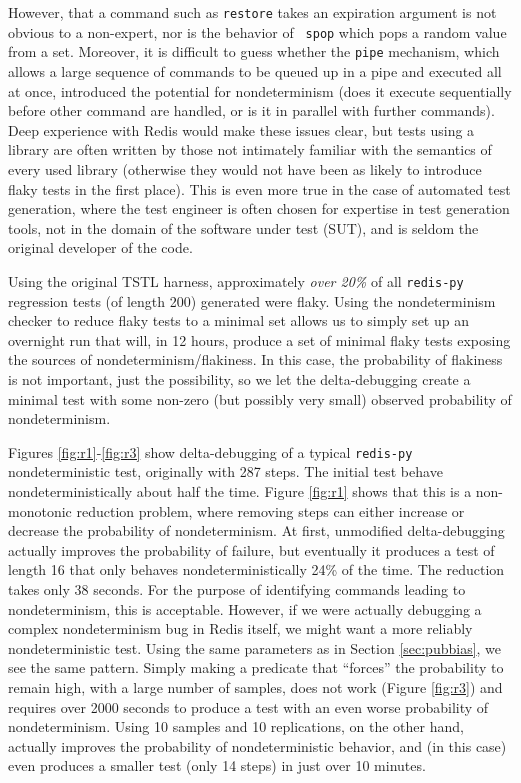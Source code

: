 However, that a command such as {\tt restore} takes an expiration
argument is not obvious to a non-expert, nor is the behavior of {\tt
  spop} which pops a random value from a set.  Moreover, it is
difficult to guess whether the {\tt pipe} mechanism, which allows a
large sequence of commands to be queued up in a pipe and executed all
at once, introduced the potential for nondeterminism (does it execute
sequentially before other command are handled, or is it in parallel
with further commands).  Deep experience with Redis would make these
issues clear, but tests using a library are often written by those not
intimately familiar with the semantics of every used library (otherwise they would not have
been as likely to introduce flaky tests in the first place).  This is
even more true in the case of automated test generation, where the
test engineer is often chosen for expertise in test generation tools,
not in the domain of the software under test (SUT), and is seldom the
original developer of the code.

Using the original TSTL harness, approximately \emph{over 20\%} of all {\tt redis-py}
regression tests (of length 200) generated were flaky.  Using the
nondeterminism checker to reduce flaky tests to a minimal set allows
us to simply set up an overnight run that will, in 12 hours, produce
a set of minimal flaky tests exposing the sources of
nondeterminism/flakiness.  In this case, the probability of flakiness
is not important, just the possibility, so we let the delta-debugging
create a minimal test with some non-zero (but possibly very small)
observed probability of nondeterminism.  

Figures \ref{fig:r1}-\ref{fig:r3} show delta-debugging of a typical
{\tt redis-py} nondeterministic test, originally with 287 steps.  The initial test behave
nondeterministically about half the time.  Figure \ref{fig:r1} shows
that this is a non-monotonic reduction problem, where removing steps
can either increase or decrease the probability of nondeterminism.  At
first, unmodified delta-debugging actually improves the probability of
failure, but eventually it produces a test of length 16 that only behaves
nondeterministically 24\% of the time.  The reduction takes only 38
seconds.  For the purpose of identifying commands leading to
nondeterminism, this is acceptable.  However, if we were actually
debugging a complex nondeterminism bug in Redis itself, we might want
a more reliably nondeterministic test.  Using the same parameters as
in Section \ref{sec:pubbias}, we see the same pattern.  Simply making
a predicate that ``forces'' the probability to remain high, with a
large number of samples, does not work (Figure \ref{fig:r3}) and
requires over 2000 seconds to produce a test with an even worse
probability of nondeterminism.  Using 10 samples and 10 replications,
on the other hand, actually improves the probability of
nondeterministic behavior, and
(in this case) even produces a smaller test (only 14 steps) in just
over 10 minutes.

